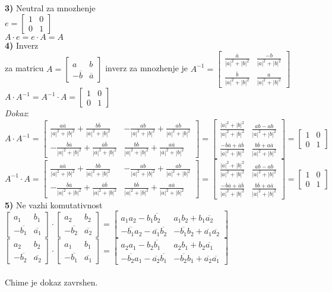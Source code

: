 \documentclass[11pt]{article}
\newcommand{\bm}{\begin{bmatrix}}
\newcommand{\enm}{\end{bmatrix}}
\newcommand{\ov}{\overline}
\begin{document}
\large \textbf{3)} Neutral za mnozhenje\\
$e=\bm 1&0\\0&1\enm$\\
$A\cdot e=e\cdot A=A$\\
\textbf{4)} Inverz\\
za matricu $A=\bm a&b\\-\ov{b}&\ov{a}\enm$ inverz za mnozhenje je $A^{-1}=\bm \frac{\ov{a}}{|a|^2+|b|^2}&\frac{-b}{|a|^2+|b|^2}\\\frac{\ov{b}}{|a|^2+|b|^2}&\frac{a}{|a|^2+|b|^2}\enm$\\
$A\cdot A^{-1}=A^{-1}\cdot A=\bm 1&0\\0&1\enm$\\
\textit{Dokaz}:\\
$A\cdot A^{-1}=\bm \frac{a\ov{a}}{|a|^2+|b|^2}+\frac{b\ov{b}}{|a|^2+|b|^2}&-\frac{ab}{|a|^2+|b|^2}+\frac{ab}{|a|^2+|b|^2}\\ -\frac{\ov{b}\ov{a}}{|a|^2+|b|^2}+\frac{\ov{a}\ov{b}}{|a|^2+|b|^2}&\frac{b\ov{b}}{|a|^2+|b|^2}+\frac{a\ov{a}}{|a|^2+|b|^2}\enm=\bm\frac{|a|^2+|b|^2}{|a|^2+|b|^2}&\frac{ab-ab}{|a|^2+|b|^2}\\\frac{-\ov{b}\ov{a}+\ov{a}\ov{b}}{|a|^2+|b|^2}&\frac{b\ov{b}+a\ov{a}}{|a|^2+|b|^2}\enm = \bm 1&0\\0&1\enm$\\
$A^{-1}\cdot A=\bm \frac{a\ov{a}}{|a|^2+|b|^2}+\frac{b\ov{b}}{|a|^2+|b|^2}&-\frac{ab}{|a|^2+|b|^2}+\frac{ab}{|a|^2+|b|^2}\\ -\frac{\ov{b}\ov{a}}{|a|^2+|b|^2}+\frac{\ov{a}\ov{b}}{|a|^2+|b|^2}&\frac{b\ov{b}}{|a|^2+|b|^2}+\frac{a\ov{a}}{|a|^2+|b|^2}\enm=\bm\frac{|a|^2+|b|^2}{|a|^2+|b|^2}&\frac{ab-ab}{|a|^2+|b|^2}\\\frac{-\ov{b}\ov{a}+\ov{a}\ov{b}}{|a|^2+|b|^2}&\frac{b\ov{b}+a\ov{a}}{|a|^2+|b|^2}\enm = \bm 1&0\\0&1\enm$\\

\textbf{5)} Ne vazhi komutativnost\\
$\bm a_1&b_1\\-\ov{b_1}&\ov{a_1}\enm \cdot \bm a_2&b_2\\-\ov{b_2}&\ov{a_2}\enm = \bm a_1a_2-b_1\ov{b_2}&a_1b_2+b_1\ov{a_2}\\ -\ov{b_1}a_2-\ov{a_1}\ov{b_2}&-\ov{b_1}b_2+\ov{a_1}\ov{a_2} \enm$\\
$\bm a_2&b_2\\-\ov{b_2}&\ov{a_2}\enm \cdot \bm a_1&b_1\\-\ov{b_1}&\ov{a_1}\enm = \bm a_2a_1-b_2\ov{b_1}&a_2b_1+b_2\ov{a_1}\\ -\ov{b_2}a_1-\ov{a_2}\ov{b_1}&-\ov{b_2}b_1+\ov{a_2}\ov{a_1} \enm$\\\\

Chime je dokaz zavrshen.
\end{document}
